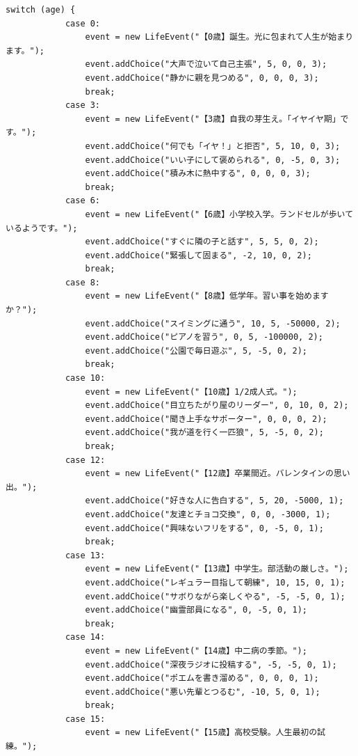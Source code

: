 \documentclass[a4paper,11pt]{jsarticle}
\begin{document}
\begin{lstlisting}[caption=GameLogic.java]
        switch (age) {
            case 0:
                event = new LifeEvent("【0歳】誕生。光に包まれて人生が始まります。");
                event.addChoice("大声で泣いて自己主張", 5, 0, 0, 3);
                event.addChoice("静かに親を見つめる", 0, 0, 0, 3);
                break;
            case 3:
                event = new LifeEvent("【3歳】自我の芽生え。「イヤイヤ期」です。");
                event.addChoice("何でも「イヤ！」と拒否", 5, 10, 0, 3);
                event.addChoice("いい子にして褒められる", 0, -5, 0, 3);
                event.addChoice("積み木に熱中する", 0, 0, 0, 3);
                break;
            case 6:
                event = new LifeEvent("【6歳】小学校入学。ランドセルが歩いているようです。");
                event.addChoice("すぐに隣の子と話す", 5, 5, 0, 2);
                event.addChoice("緊張して固まる", -2, 10, 0, 2);
                break;
            case 8:
                event = new LifeEvent("【8歳】低学年。習い事を始めますか？");
                event.addChoice("スイミングに通う", 10, 5, -50000, 2);
                event.addChoice("ピアノを習う", 0, 5, -100000, 2);
                event.addChoice("公園で毎日遊ぶ", 5, -5, 0, 2);
                break;
            case 10:
                event = new LifeEvent("【10歳】1/2成人式。");
                event.addChoice("目立ちたがり屋のリーダー", 0, 10, 0, 2);
                event.addChoice("聞き上手なサポーター", 0, 0, 0, 2);
                event.addChoice("我が道を行く一匹狼", 5, -5, 0, 2);
                break;
            case 12:
                event = new LifeEvent("【12歳】卒業間近。バレンタインの思い出。");
                event.addChoice("好きな人に告白する", 5, 20, -5000, 1);
                event.addChoice("友達とチョコ交換", 0, 0, -3000, 1);
                event.addChoice("興味ないフリをする", 0, -5, 0, 1);
                break;
            case 13:
                event = new LifeEvent("【13歳】中学生。部活動の厳しさ。");
                event.addChoice("レギュラー目指して朝練", 10, 15, 0, 1);
                event.addChoice("サボりながら楽しくやる", -5, -5, 0, 1);
                event.addChoice("幽霊部員になる", 0, -5, 0, 1);
                break;
            case 14:
                event = new LifeEvent("【14歳】中二病の季節。");
                event.addChoice("深夜ラジオに投稿する", -5, -5, 0, 1);
                event.addChoice("ポエムを書き溜める", 0, 0, 0, 1);
                event.addChoice("悪い先輩とつるむ", -10, 5, 0, 1);
                break;
            case 15:
                event = new LifeEvent("【15歳】高校受験。人生最初の試練。");

\end{lstlisting}
\end{document}
